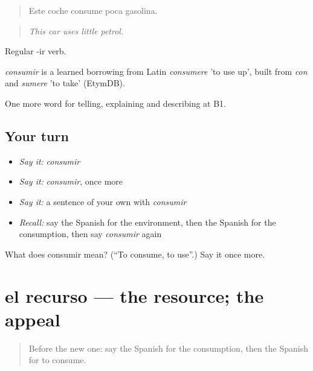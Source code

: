 \begin{quote}
Este coche consume poca gasolina.
\end{quote}

\begin{quote}
\emph{This car uses little petrol.}
\end{quote}

Regular -ir verb.

\begin{cousinweb}
\emph{consumir} is a learned borrowing from Latin \emph{consumere} 'to use up', built from \emph{con} and \emph{sumere} 'to take' (EtymDB).
\end{cousinweb}

\begin{grammarlens}[title={What you've built}]
One more word for telling, explaining and describing at B1.
\end{grammarlens}

\subsection*{Your turn}
\begin{itemize}
\raggedright
  \item \emph{Say it:} \emph{consumir}
  \item \emph{Say it:} \emph{consumir}, once more
  \item \emph{Say it:} a sentence of your own with \emph{consumir}
  \item \emph{Recall:} say the Spanish for the environment, then the Spanish for the consumption, then say \emph{consumir} again
\end{itemize}

\begin{tcolorbox}[breakable,colback=teal!4,colframe=teal!35!black,title={Before you move on}]
What does consumir mean? (\textquotedblleft{}To consume, to use\textquotedblright{}.) Say it once more.
\end{tcolorbox}
\section[el recurso]{el recurso — the resource; the appeal}

\label{lesson:ES-C607-recurso}



\begin{quote}
Before the new one: say the Spanish for the consumption, then the Spanish for to consume.
\end{quote}

